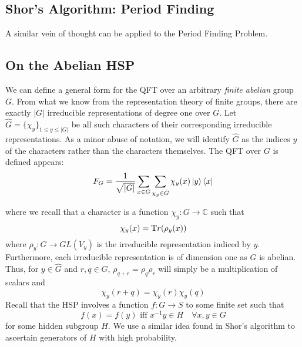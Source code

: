 \documentclass{../quantum.tex}
\begin{document}
\subsection{Shor's Algorithm: Period Finding}
A similar vein of thought can be applied to the Period Finding Problem.

\subsection{On the Abelian HSP}

We can define a general form for the QFT over an arbitrary \textit{finite abelian} group $G$. From what we know from the representation theory of finite groups, there are exactly $|G|$ irreducible representations of degree one over $G$. Let $\hat{G} = \{\chi_y\}_{1 \leq y \leq |G|}$ be all such characters of their corresponding irreducible representations. As a minor abuse of notation, we will identify $\hat{G}$ as the indices $y$ of the characters rather than the characters themselves. The QFT over $G$ is defined appears:
%
\begin{equation}
  \label{abelQFT}
  F_{G} = \frac{1}{\sqrt{|G|}}\sum_{x \in G}\sum_{\chi_y \in \hat{G}} \chi_y(x) \ket{y}\bra{x}
\end{equation}

where we recall that a character is a function $\chi_y: G \rightarrow \mathbb{C}$ such that
$$ \chi_y(x) = {\text Tr}(\rho_y(x)) $$ where $\rho_y : G \rightarrow GL(V_y)$ is the irreducible representation indiced by $y$. Furthermore, each irreducible representation is of dimension one as $G$ is abelian.
%
Thus, for $y \in \hat{G}$ and $r,q \in G$, $\rho_{q+r} = \rho_q\rho_r$ will simply be a multiplication of scalars and
\begin{equation}
  \label{abelianscale}
  \chi_y(r + q) = \chi_y(r)\chi_y(q)
\end{equation}
%
Recall that the HSP involves a function $f: G \rightarrow S$ to some finite set such that
%
$$ f(x) = f(y) \text{ iff } x^{-1}y \in H \quad \forall x,y \in G$$ for some hidden subgroup $H$. We use a similar idea found in Shor's algorithm to ascertain generators of $H$ with high probability.
%
\end{document}
